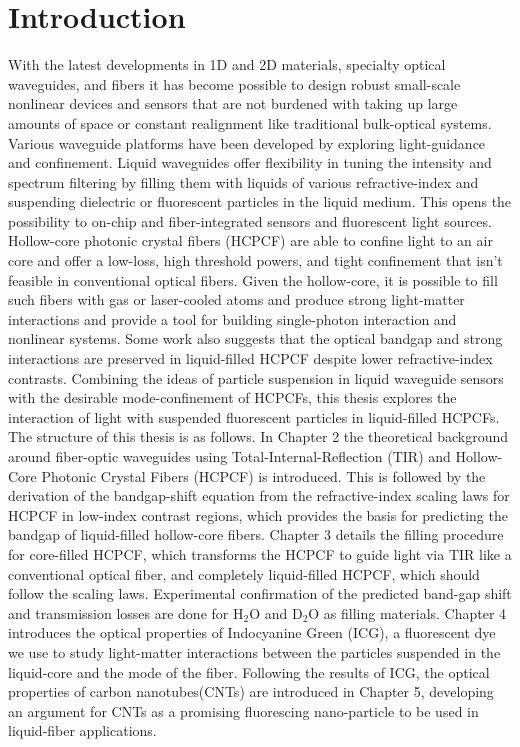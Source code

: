 \chapter{Introduction}
With the latest developments in 1D and 2D materials, specialty optical waveguides, and fibers it has become possible to design robust small-scale nonlinear devices and sensors\cite{cusano,yamashita.tutorial} that are not burdened with taking up large amounts of space or constant realignment like traditional bulk-optical systems.
Various waveguide platforms have been developed by exploring light-guidance and confinement.
Liquid waveguides offer flexibility in tuning the intensity and spectrum filtering by filling them with liquids of various refractive-index and suspending dielectric or fluorescent particles in the liquid medium\cite{conroy, bliss, vezenov}.
This opens the possibility to on-chip and fiber-integrated sensors and fluorescent light sources.\\
Hollow-core photonic crystal fibers (HCPCF) are able to confine light to an air core and offer a low-loss, high threshold powers, and tight confinement that isn't feasible in conventional optical fibers.
Given the hollow-core, it is possible to fill such fibers with gas or laser-cooled atoms and produce strong light-matter interactions\cite{bajcsy, hilton} and provide a tool for building single-photon interaction and nonlinear systems.
Some work also suggests that the optical bandgap and strong interactions are preserved in liquid-filled HCPCF \cite{antonopoulos} despite lower refractive-index contrasts.
Combining the ideas of particle suspension in liquid waveguide sensors with the desirable mode-confinement of HCPCFs, this thesis explores the interaction of light with suspended fluorescent particles in liquid-filled HCPCFs.\\ 

The structure of this thesis is as follows. In Chapter 2 the theoretical background around fiber-optic waveguides using Total-Internal-Reflection (TIR) and Hollow-Core Photonic Crystal Fibers (HCPCF) is introduced. This is followed by the derivation of the bandgap-shift equation from the refractive-index scaling laws for HCPCF in low-index contrast regions, which provides the basis for predicting the bandgap of liquid-filled hollow-core fibers.
Chapter 3 details the filling procedure for core-filled HCPCF, which transforms the HCPCF to guide light via TIR like a conventional optical fiber, and completely liquid-filled HCPCF, which should follow the scaling laws. Experimental confirmation of the predicted band-gap shift and transmission losses are done for H${}_2$O and D${}_2$O as filling materials. Chapter 4 introduces the optical properties of Indocyanine Green (ICG), a fluorescent dye we use to study light-matter interactions between the particles suspended in the liquid-core and the mode of the fiber. Following the results of ICG, the optical properties of carbon nanotubes(CNTs) are introduced in Chapter 5, developing an argument for CNTs as a promising fluorescing nano-particle to be used in liquid-fiber applications. 
